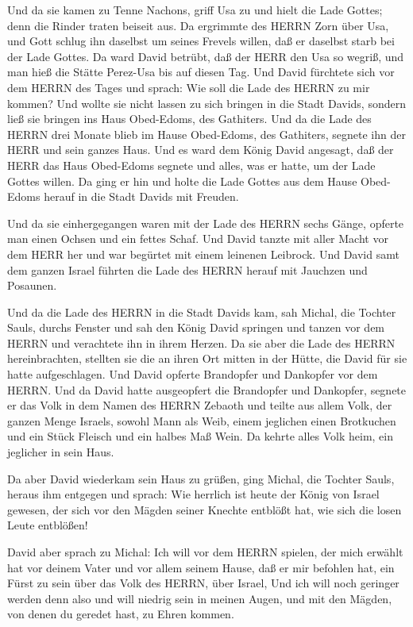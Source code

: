  Und da sie kamen zu Tenne Nachons, griff Usa zu und hielt
die Lade Gottes; denn die Rinder traten beiseit aus.  Da
ergrimmte des HERRN Zorn über Usa, und Gott schlug ihn daselbst um
seines Frevels willen, daß er daselbst starb bei der Lade Gottes.
 Da ward David betrübt, daß der HERR den Usa so wegriß, und
man hieß die Stätte Perez-Usa bis auf diesen Tag.  Und David
fürchtete sich vor dem HERRN des Tages und sprach: Wie soll die Lade des
HERRN zu mir kommen?  Und wollte sie nicht lassen zu sich
bringen in die Stadt Davids, sondern ließ sie bringen ins Haus
Obed-Edoms, des Gathiters.  Und da die Lade des HERRN drei
Monate blieb im Hause Obed-Edoms, des Gathiters, segnete ihn der HERR
und sein ganzes Haus.  Und es ward dem König David
angesagt, daß der HERR das Haus Obed-Edoms segnete und alles, was er
hatte, um der Lade Gottes willen. Da ging er hin und holte die Lade
Gottes aus dem Hause Obed-Edoms herauf in die Stadt Davids mit Freuden.

 Und da sie einhergegangen waren mit der Lade des HERRN
sechs Gänge, opferte man einen Ochsen und ein fettes Schaf.
 Und David tanzte mit aller Macht vor dem HERR her und war
begürtet mit einem leinenen Leibrock.  Und David samt dem
ganzen Israel führten die Lade des HERRN herauf mit Jauchzen und
Posaunen.

 Und da die Lade des HERRN in die Stadt Davids kam, sah
Michal, die Tochter Sauls, durchs Fenster und sah den König David
springen und tanzen vor dem HERRN und verachtete ihn in ihrem Herzen.
 Da sie aber die Lade des HERRN hereinbrachten, stellten
sie die an ihren Ort mitten in der Hütte, die David für sie hatte
aufgeschlagen. Und David opferte Brandopfer und Dankopfer vor dem HERRN.
 Und da David hatte ausgeopfert die Brandopfer und
Dankopfer, segnete er das Volk in dem Namen des HERRN Zebaoth
 und teilte aus allem Volk, der ganzen Menge Israels,
sowohl Mann als Weib, einem jeglichen einen Brotkuchen und ein Stück
Fleisch und ein halbes Maß Wein. Da kehrte alles Volk heim, ein
jeglicher in sein Haus.

 Da aber David wiederkam sein Haus zu grüßen, ging Michal,
die Tochter Sauls, heraus ihm entgegen und sprach: Wie herrlich ist
heute der König von Israel gewesen, der sich vor den Mägden seiner
Knechte entblößt hat, wie sich die losen Leute entblößen!

 David aber sprach zu Michal: Ich will vor dem HERRN
spielen, der mich erwählt hat vor deinem Vater und vor allem seinem
Hause, daß er mir befohlen hat, ein Fürst zu sein über das Volk des
HERRN, über Israel,  Und ich will noch geringer werden denn
also und will niedrig sein in meinen Augen, und mit den Mägden, von
denen du geredet hast, zu Ehren kommen.

